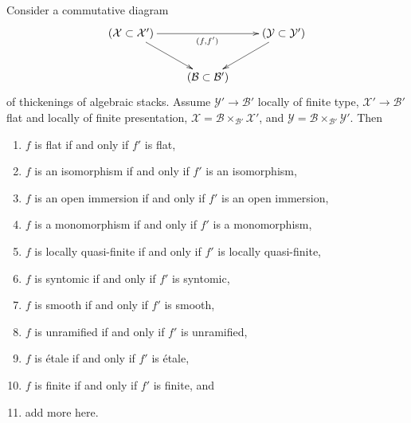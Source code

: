 \begin{lemma}
\label{lemma-deform-property-fp-over-ft}
Consider a commutative diagram
$$
\xymatrix{
(\mathcal{X} \subset \mathcal{X}') \ar[rr]_{(f, f')} \ar[rd] & &
(\mathcal{Y} \subset \mathcal{Y}') \ar[ld] \\
& (\mathcal{B} \subset \mathcal{B}')
}
$$
of thickenings of algebraic stacks.
Assume $\mathcal{Y}' \to \mathcal{B}'$ locally of finite type,
$\mathcal{X}' \to \mathcal{B}'$ flat and locally of finite presentation,
$\mathcal{X} = \mathcal{B} \times_{\mathcal{B}'} \mathcal{X}'$, and
$\mathcal{Y} = \mathcal{B} \times_{\mathcal{B}'} \mathcal{Y}'$. Then
\begin{enumerate}
\item $f$ is flat if and only if $f'$ is flat,
\label{item-flat-fp-over-ft}
\item $f$ is an isomorphism if and only if $f'$ is an isomorphism,
\label{item-isomorphism-fp-over-ft}
\item $f$ is an open immersion if and only if $f'$ is an open immersion,
\label{item-open-immersion-fp-over-ft}
\item $f$ is a monomorphism if and only if $f'$ is a monomorphism,
\label{item-monomorphism-fp-over-ft}
\item $f$ is locally quasi-finite if and only if $f'$ is locally quasi-finite,
\label{item-quasi-finite-fp-over-ft}
\item $f$ is syntomic if and only if $f'$ is syntomic,
\label{item-syntomic-fp-over-ft}
\item $f$ is smooth if and only if $f'$ is smooth,
\label{item-smooth-fp-over-ft}
\item $f$ is unramified if and only if $f'$ is unramified,
\label{item-unramified-fp-over-ft}
\item $f$ is \'etale if and only if $f'$ is \'etale,
\label{item-etale-fp-over-ft}
\item $f$ is finite if and only if $f'$ is finite, and
\label{item-finite-fp-over-ft}
\item add more here.
\end{enumerate}
\end{lemma}

